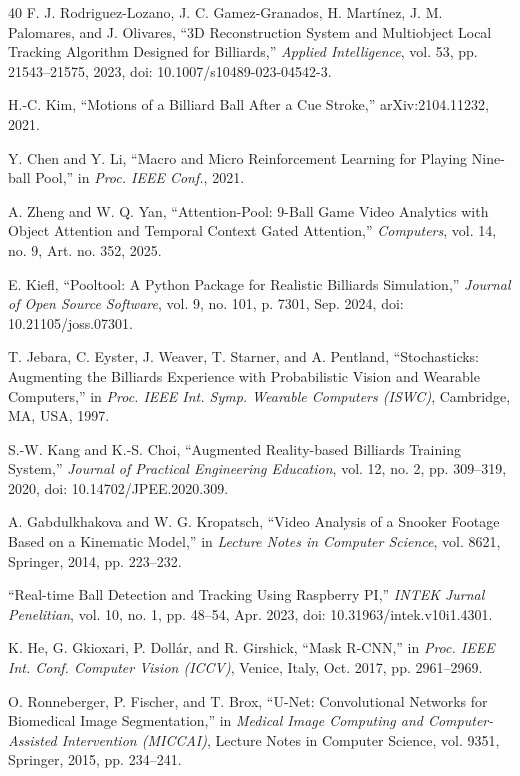 \begin{thebibliography}{40}
 F. J. Rodriguez-Lozano, J. C. Gamez-Granados, H. Mart{\'i}nez, J. M. Palomares, and J. Olivares, ``3D Reconstruction System and Multiobject Local Tracking Algorithm Designed for Billiards,'' \textit{Applied Intelligence}, vol. 53, pp. 21543--21575, 2023, doi: 10.1007/s10489-023-04542-3.

 H.-C. Kim, ``Motions of a Billiard Ball After a Cue Stroke,'' arXiv:2104.11232, 2021.

 Y. Chen and Y. Li, ``Macro and Micro Reinforcement Learning for Playing Nine-ball Pool,'' in \textit{Proc. IEEE Conf.}, 2021.

 A. Zheng and W. Q. Yan, ``Attention-Pool: 9-Ball Game Video Analytics with Object Attention and Temporal Context Gated Attention,'' \textit{Computers}, vol. 14, no. 9, Art. no. 352, 2025.

 E. Kiefl, ``Pooltool: A Python Package for Realistic Billiards Simulation,'' \textit{Journal of Open Source Software}, vol. 9, no. 101, p. 7301, Sep. 2024, doi: 10.21105/joss.07301.

 T. Jebara, C. Eyster, J. Weaver, T. Starner, and A. Pentland, ``Stochasticks: Augmenting the Billiards Experience with Probabilistic Vision and Wearable Computers,'' in \textit{Proc. IEEE Int. Symp. Wearable Computers (ISWC)}, Cambridge, MA, USA, 1997.

 S.-W. Kang and K.-S. Choi, ``Augmented Reality-based Billiards Training System,'' \textit{Journal of Practical Engineering Education}, vol. 12, no. 2, pp. 309--319, 2020, doi: 10.14702/JPEE.2020.309.

 A. Gabdulkhakova and W. G. Kropatsch, ``Video Analysis of a Snooker Footage Based on a Kinematic Model,'' in \textit{Lecture Notes in Computer Science}, vol. 8621, Springer, 2014, pp. 223--232.

 ``Real-time Ball Detection and Tracking Using Raspberry PI,'' \textit{INTEK Jurnal Penelitian}, vol. 10, no. 1, pp. 48--54, Apr. 2023, doi: 10.31963/intek.v10i1.4301.

 K. He, G. Gkioxari, P. Doll{\'a}r, and R. Girshick, ``Mask R-CNN,'' in \textit{Proc. IEEE Int. Conf. Computer Vision (ICCV)}, Venice, Italy, Oct. 2017, pp. 2961--2969.

 O. Ronneberger, P. Fischer, and T. Brox, ``U-Net: Convolutional Networks for Biomedical Image Segmentation,'' in \textit{Medical Image Computing and Computer-Assisted Intervention (MICCAI)}, Lecture Notes in Computer Science, vol. 9351, Springer, 2015, pp. 234--241.


\end{thebibliography}
